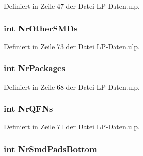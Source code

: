 Definiert in Zeile 47 der Datei L\+P-\/\+Daten.\+ulp.

\hypertarget{_l_p-_daten_8ulp_a48a0d606a48307103a8dac0c46b83f38}{}
\subsubsection[{Nr\+Other\+S\+M\+Ds}]{\setlength{\rightskip}{0pt plus 5cm}int Nr\+Other\+S\+M\+Ds}\label{_l_p-_daten_8ulp_a48a0d606a48307103a8dac0c46b83f38}


Definiert in Zeile 73 der Datei L\+P-\/\+Daten.\+ulp.

\hypertarget{_l_p-_daten_8ulp_aaab850437635db44a15b39d0f6bb95c8}{}
\subsubsection[{Nr\+Packages}]{\setlength{\rightskip}{0pt plus 5cm}int Nr\+Packages}\label{_l_p-_daten_8ulp_aaab850437635db44a15b39d0f6bb95c8}


Definiert in Zeile 68 der Datei L\+P-\/\+Daten.\+ulp.

\hypertarget{_l_p-_daten_8ulp_af84a85c1781d94cf67473f876c6ed7ef}{}
\subsubsection[{Nr\+Q\+F\+Ns}]{\setlength{\rightskip}{0pt plus 5cm}int Nr\+Q\+F\+Ns}\label{_l_p-_daten_8ulp_af84a85c1781d94cf67473f876c6ed7ef}


Definiert in Zeile 71 der Datei L\+P-\/\+Daten.\+ulp.

\hypertarget{_l_p-_daten_8ulp_a105dcfe5e158f7f55cf8c729b9332d98}{}
\subsubsection[{Nr\+Smd\+Pads\+Bottom}]{\setlength{\rightskip}{0pt plus 5cm}int Nr\+Smd\+Pads\+Bottom}\label{_l_p-_daten_8ulp_a105dcfe5e158f7f55cf8c729b9332d98}



